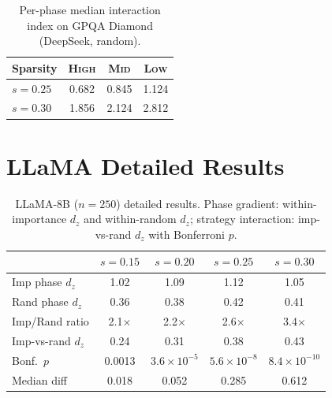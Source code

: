 \documentclass[11pt,a4paper]{article}
\begin{document}
\begin{table}[h]
\centering
\small
\caption{Per-phase median interaction index on GPQA Diamond (DeepSeek, random).}
\begin{tabular}{@{}lccc@{}}
\toprule
Sparsity & \textsc{High} & \textsc{Mid} & \textsc{Low} \\
\midrule
$s = 0.25$ & 0.682 & 0.845 & 1.124 \\
$s = 0.30$ & 1.856 & 2.124 & 2.812 \\
\bottomrule
\end{tabular}
\end{table}

\section{LLaMA Detailed Results}
\label{app:llama}

\begin{table}[h]
\centering
\small
\caption{LLaMA-8B ($n\!=\!250$) detailed results. Phase gradient: within-importance $d_z$ and within-random $d_z$; strategy interaction: imp-vs-rand $d_z$ with Bonferroni $p$.}
\begin{tabular}{@{}lcccc@{}}
\toprule
& $s\!=\!0.15$ & $s\!=\!0.20$ & $s\!=\!0.25$ & $s\!=\!0.30$ \\
\midrule
Imp phase $d_z$ & 1.02 & 1.09 & 1.12 & 1.05 \\
Rand phase $d_z$ & 0.36 & 0.38 & 0.42 & 0.41 \\
Imp/Rand ratio & 2.1$\times$ & 2.2$\times$ & 2.6$\times$ & 3.4$\times$ \\
\midrule
Imp-vs-rand $d_z$ & 0.24 & 0.31 & 0.38 & 0.43 \\
Bonf.\ $p$ & 0.0013 & $3.6\!\times\!10^{-5}$ & $5.6\!\times\!10^{-8}$ & $8.4\!\times\!10^{-10}$ \\
Median diff & 0.018 & 0.052 & 0.285 & 0.612 \\
\bottomrule
\end{tabular}
\end{table}
\end{document}
